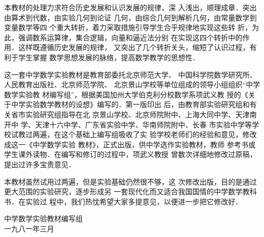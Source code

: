     本教材的处理力求符合历史发展和认识发展的规律，深
入浅出，顺理成章．突出由算术到代数，由实验几何到论证
几何，由综合几何到解析几何，由常量数学到变量数学等四
个重大转折，着力采取措施引导学生合乎规律地实现这些转
折，为此，强调数系运算律，集合逻辑，向量和逼近法分别
在实现这四个转折中的作用．这样既遵循历史发展的规律，
又突出了几个转折关头，缩短了认识过程，有利于学生掌握
数学思想发展的脉络，提高数学教学的思想性．

这一套中学数学实验教材是教育部委托北京师范大学、
中国科学院数学研究所、人民教育出版社、北京师范学院、
北京景山学校等单位组成的领导小组组织“中学数学实验教
材编写组”，根据美国加州大学伯克利分校数学系项武义教
授的《关于中学实验数学教材的设想》编写的．第一版印出
后，由教育部实验研究组和有关省市实验研究组指导在北
京景山学校、北京师院附中、上海大同中学、天津南开中
学、天津十六中学、广东省实验中学、华南师院附中、长春
市实验中学等学校试教过两遍，在这个基础上编写组吸收了实
验学校老师们的经验和意见，修改成这一《中学数学实验
教材》，正式出版，供中学选作实验教材，教师
参考书或学生课外读物．在编写和修订的过程中，项武义教授
曾数次详细地修改过原稿，提出过许多宝贵意见．

    本教材虽然试用过两遍，但是实验基础仍然很不够，这
次修改出版，目的是通过更大范围的实验研究，逐步形成另
一套现代化而又适合我国国情的中学数学教科书．在实验过
程中，我们热忱希望大家多提意见，以便进一步把它修改好．

\begin{flushright}
    中学数学实验教材编写组\\
    一九八一年三月
\end{flushright}







